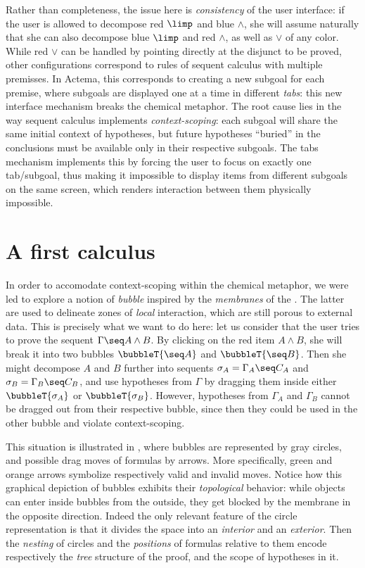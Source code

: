 Rather than completeness, the issue here is \emph{consistency} of the user
interface: if the user is allowed to decompose red $\limp$ and blue $\land$, she
will assume naturally that she can also decompose blue $\limp$ and red $\land$,
as well as $\lor$ of any color. While red $\lor$ can be handled by pointing
directly at the disjunct to be proved, other configurations correspond to rules
of sequent calculus with multiple premisses. In Actema, this corresponds to
creating a new subgoal for each premise, where subgoals are displayed one at a
time in different \emph{tabs}: this new interface mechanism breaks the chemical
metaphor. The root cause lies in the way sequent calculus implements
\emph{context-scoping}: each subgoal will share the same initial context of
hypotheses, but future hypotheses ``buried'' in the conclusions must be
available only in their respective subgoals. The tabs mechanism implements this
by forcing the user to focus on exactly one tab/subgoal, thus making it
impossible to display items from different subgoals on the same screen, which
renders interaction between them physically impossible.


\section{A first calculus}

In order to accomodate context-scoping within the chemical metaphor, we were led
to explore a notion of \emph{bubble} inspired by the \emph{membranes} of the
{\cham} \cite{berry_chemical_1989}. The latter are used to delineate zones of
\emph{local} interaction, which are still porous to external data. This is
precisely what we want to do here: let us consider that the user tries to prove
the sequent $\Gamma \seq A \land B$. By clicking on the red item $A \land B$,
she will break it into two bubbles $\bubbleT{\seq A}$ and $\bubbleT{\seq B}$.
Then she might decompose $A$ and $B$ further into sequents $\sigma_A = \Gamma_A
\seq C_A$ and $\sigma_B = \Gamma_B \seq C_B$, and use hypotheses from $\Gamma$
by dragging them inside either $\bubbleT{\sigma_A}$ or $\bubbleT{\sigma_B}$.
However, hypotheses from $\Gamma_A$ and $\Gamma_B$ cannot be dragged out from
their respective bubble, since then they could be used in the other bubble and
violate context-scoping.

This situation is illustrated in , where bubbles are
represented by gray circles, and possible drag moves of formulas by arrows. More
specifically, green and orange arrows symbolize respectively valid and invalid
moves. Notice how this graphical depiction of bubbles exhibits their
\emph{topological} behavior: while objects can enter inside bubbles from the
outside, they get blocked by the membrane in the opposite direction. Indeed the
only relevant feature of the circle representation is that it divides the space
into an \emph{interior} and an \emph{exterior}. Then the \emph{nesting} of
circles and the \emph{positions} of formulas relative to them encode
respectively the \emph{tree} structure of the proof, and the scope of hypotheses
in it.

